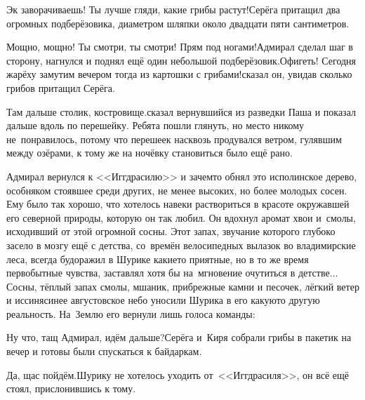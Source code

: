 
\diagdash Эк заворачиваешь! Ты лучше гляди, какие грибы растут!\mdash Серёга притащил два огромных подберёзовика, диаметром шляпки около двадцати пяти сантиметров.  

\diagdash Мощно, мощно! Ты смотри, ты смотри! Прям под ногами!\mdash Адмирал сделал шаг в сторону, нагнулся и поднял ещё один небольшой подберёзовик.\mdash Офигеть! Сегодня жарёху замутим вечером тогда из картошки с грибами!\mdash сказал он, увидав сколько грибов притащил Серёга. 

\diagdash Там дальше столик, костровище.\mdash сказал вернувшийся из разведки Паша и показал дальше вдоль по перешейку. Ребята пошли глянуть, но место никому не~понравилось, потому что перешеек насквозь продувался ветром, гулявшим между озёрами, к тому же на ночёвку становиться было ещё рано. 

Адмирал вернулся к <<Иггдрасилю>> и зачем\sdash то обнял это исполинское дерево, особняком стоявшее среди других, не менее высоких, но более молодых сосен. Ему было так хорошо, что хотелось навеки раствориться в красоте окружавшей его северной природы, которую он так любил. Он вдохнул аромат хвои и~смолы, исходивший от этой огромной сосны. Этот запах, звучание которого глубоко засело в мозгу ещё с детства, со~времён велосипедных вылазок во владимирские леса, всегда будоражил в Шурике какие\sdash то приятные, но в то же время первобытные чувства, заставлял хотя бы на~мгновение очутиться в детстве$\ldots$ Сосны, тёплый запах смолы, мшаник, прибрежные камни и песочек, лёгкий ветер и иссиня\sdash синее августовское небо уносили Шурика в его какую\sdash то другую реальность. На~Землю его вернули лишь голоса команды:

\diagdash Ну что, тащ Адмирал, идём дальше?\mdash Серёга и~Киря собрали грибы в пакетик на вечер и готовы были спускаться к байдаркам.

\diagdash Да, щас пойдём.\mdash Шурику не хотелось уходить от~<<Иггдрасиля>>, он всё ещё стоял, прислонившись к тому. 

